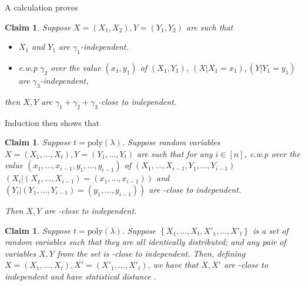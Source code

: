 \documentclass[11pt]{article}
\numberwithin{equation}{section} %
\numberwithin{figure}{section} %
\newtheorem{claim}[thm]{Claim}
\newcommand{\set}[1]{\ensuremath{\left\{#1\right\}}\xspace}
\newcommand{\poly}{\ensuremath{\mathrm{poly}(\lambda)}\xspace}
\begin{document}
A calculation proves
\begin{claim}\label{clm:close_to_ind}
 Suppose $X=(X_1,X_2), Y=(Y_1,Y_2)$ are such that 
 \begin{itemize}
 \item $X_1$ and $Y_1$ are $\gamma_1$-independent.
  \item 
 e.w.p $\gamma_2$ over the value $(x_1,y_1)$ of $(X_1,Y_1)$, $(X|X_1=x_1), (Y|Y_1 = y_1)$ are $\gamma_3$-independent,
 \end{itemize}

 then $X,Y$ are $\gamma_1+\gamma_2+\gamma_3$-close to independent.
 \end{claim}

 Induction then shows that
 \begin{claim}\label{clm:neg_close_to_ind}
  Suppose $t=\poly$. Suppose random variables $X=(X_1,\ldots,X_t),Y=(Y_1,\ldots,Y_t)$ are such that
  for any $i\in [n]$, e.w.p \negl over the value $(x_1,\ldots,x_{i-1},y_1,\ldots,y_{i-1})$ of $(X_1,\ldots,X_{i-1},Y_{1},\ldots,Y_{i-1})$
  $(X_i|(X_1,\ldots,X_{i-1})=(x_1,\ldots,x_{i-1}))$ and $(Y_i|(Y_1,\ldots,Y_{i-1})=(y_1,\ldots,y_{i-1}))$ are \negl-close to independent.
  
  Then $X,Y$ are \negl-close to independent.
 \end{claim}


\begin{claim}\label{clm:pairs_to_all}
 Suppose $t=\poly$. Suppose \set{X_1,\ldots,X_t,X'_1,\ldots,X'_t} is a set of random variables such that
 they are all identically distributed; and any pair of variables $X,Y$ from the set is \negl-close to independent.
 Then, defining $X=(X_1,\ldots,X_t), X'=(X'_1,\ldots,X'_t)$, we have that $X,X'$ are \negl-close to independent and 
 have statistical distance \negl.
\end{claim}
\end{document}
